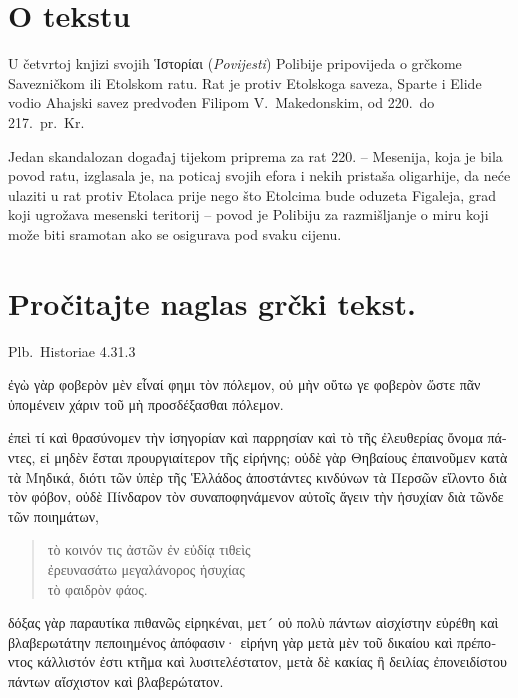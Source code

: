 

\section*{O tekstu}

U četvrtoj knjizi svojih \textgreek[variant=ancient]{Ἱστορίαι} (\textit{Povijesti}) Polibije pripovijeda o grčkome Savezničkom ili Etolskom ratu. Rat je protiv Etolskoga saveza, Sparte i Elide vodio Ahajski savez predvođen Filipom V.\ Makedonskim, od 220.\ do 217.\ pr.~Kr.

Jedan skandalozan događaj tijekom priprema za rat 220. – Mesenija, koja je bila povod ratu, izglasala je, na poticaj svojih efora i nekih pristaša oligarhije, da neće ulaziti u rat protiv Etolaca prije nego što Etolcima bude oduzeta Figaleja, grad koji ugrožava mesenski teritorij – povod je Polibiju za razmišljanje o miru koji može biti sramotan ako se osigurava pod svaku cijenu.





\section*{Pročitajte naglas grčki tekst.}

Plb.\ Historiae 4.31.3

\medskip


{\large

\begin{greek}

\noindent ἐγὼ γὰρ φοβερὸν μὲν εἶναί φημι τὸν πόλεμον, οὐ μὴν οὕτω γε φοβερὸν ὥστε πᾶν ὑπομένειν χάριν τοῦ μὴ προσδέξασθαι πόλεμον.

\noindent ἐπεὶ τί καὶ θρασύνομεν τὴν ἰσηγορίαν καὶ παρρησίαν καὶ τὸ τῆς ἐλευθερίας ὄνομα πάντες, εἰ μηδὲν ἔσται προυργιαίτερον τῆς εἰρήνης; οὐδὲ γὰρ Θηβαίους ἐπαινοῦμεν κατὰ τὰ Μηδικά, διότι τῶν ὑπὲρ τῆς Ἑλλάδος ἀποστάντες κινδύνων τὰ Περσῶν εἵλοντο διὰ τὸν φόβον, οὐδὲ Πίνδαρον τὸν συναποφηνάμενον αὐτοῖς ἄγειν τὴν ἡσυχίαν διὰ τῶνδε τῶν ποιημάτων,
\begin{verse}
τὸ κοινόν τις ἀστῶν ἐν εὐδίᾳ τιθεὶς\\
ἐρευνασάτω μεγαλάνορος ἡσυχίας\\
τὸ φαιδρὸν φάος.\\

\end{verse}
δόξας γὰρ παραυτίκα πιθανῶς εἰρηκέναι, μετ´ οὐ πολὺ πάντων αἰσχίστην εὑρέθη καὶ βλαβερωτάτην πεποιημένος ἀπόφασιν· εἰρήνη γὰρ μετὰ μὲν τοῦ δικαίου καὶ πρέποντος κάλλιστόν ἐστι κτῆμα καὶ λυσιτελέστατον, μετὰ δὲ κακίας ἢ δειλίας ἐπονειδίστου πάντων αἴσχιστον καὶ βλαβερώτατον.

\end{greek}

}

